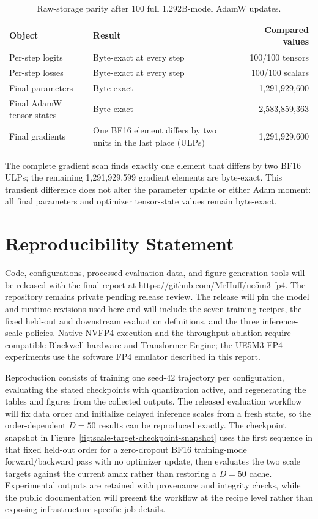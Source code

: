 \documentclass[11pt]{article}
\newcommand{\uefp}{UE5M3 FP4}
\newcommand{\nv}{NVFP4}
\begin{document}
\begin{table}[H]
  \centering
  \small
  \caption{Raw-storage parity after 100 full 1.292B-model AdamW updates.}
  \label{tab:100step-parity}
  \begin{tabularx}{\textwidth}{@{}lYr@{}}
    \toprule
    Object & Result & Compared values \\
    \midrule
    Per-step logits & Byte-exact at every step & 100/100 tensors \\
    Per-step losses & Byte-exact at every step & 100/100 scalars \\
    Final parameters & Byte-exact & 1,291,929,600 \\
    Final AdamW tensor states & Byte-exact & 2,583,859,363 \\
    Final gradients & One BF16 element differs by two units in the last place
      (ULPs) &
      1,291,929,600 \\
    \bottomrule
  \end{tabularx}
\end{table}

The complete gradient scan finds exactly one element that differs by two BF16
ULPs; the remaining 1,291,929,599 gradient elements are byte-exact.  This transient
difference does not alter the parameter update or either Adam moment: all
final parameters and optimizer tensor-state values remain byte-exact.

\section{Reproducibility Statement}

Code, configurations, processed evaluation data, and figure-generation tools
will be released with the final report at
\url{https://github.com/MrHuff/ue5m3-fp4}.  The repository remains private
pending release review.  The release will pin the model and runtime revisions
used here and will include the seven training recipes, the
fixed held-out and downstream evaluation definitions, and the three
inference-scale policies.  Native \nv{} execution and the throughput ablation
require compatible Blackwell hardware and Transformer Engine; the \uefp{}
experiments use the software FP4 emulator described in this report.

Reproduction consists of training one seed-42 trajectory per configuration,
evaluating the stated checkpoints with quantization active, and regenerating
the tables and figures from the collected outputs.  The released evaluation
workflow will fix data order and initialize delayed inference scales from a
fresh state, so the order-dependent $D=50$ results can be reproduced exactly.
The checkpoint snapshot in Figure~\ref{fig:scale-target-checkpoint-snapshot}
uses the first sequence in that fixed held-out order for a zero-dropout BF16
training-mode forward/backward pass with no optimizer update, then evaluates
the two scale targets against the current amax rather than restoring a $D=50$
cache.
Experimental outputs are retained with provenance and integrity checks, while
the public documentation will present the workflow at the recipe level rather
than exposing infrastructure-specific job details.
\end{document}

